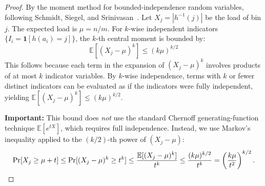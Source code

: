 \documentclass[11pt]{article}
\begin{document}
\begin{proof}
By the moment method for bounded-independence random variables,
following Schmidt, Siegel, and Srinivasan~\cite{schmidt1995chernoff}.
Let $X_j = |h^{-1}(j)|$ be the load of bin $j$.  The expected load is
$\mu = n/m$.  For $k$-wise independent indicators $\{I_i = \mathbf{1}[h(a_i) = j]\}$,
the $k$-th central moment is bounded by:
\[
  \mathbb{E}[(X_j - \mu)^k] \le (k\mu)^{k/2}
\]
This follows because each term in the expansion of $(X_j - \mu)^k$
involves products of at most $k$ indicator variables.  By $k$-wise
independence, terms with $k$ or fewer distinct indicators can be
evaluated as if the indicators were fully independent, yielding
$\mathbb{E}[(X_j - \mu)^k] \le (k\mu)^{k/2}$.

\textbf{Important:} This bound does \emph{not} use the standard Chernoff
generating-function technique $\mathbb{E}[e^{tX}]$, which requires full
independence.  Instead, we use Markov's inequality applied to
the $(k/2)$-th power of $(X_j - \mu)$:
\[
  \Pr[X_j \ge \mu + t] \le \Pr[(X_j - \mu)^{k} \ge t^{k}]
  \le \frac{\mathbb{E}[(X_j - \mu)^{k}]}{t^{k}}
  \le \frac{(k\mu)^{k/2}}{t^{k}}
  = \left(\frac{k\mu}{t^2}\right)^{k/2}. \qedhere
\]
\end{proof}
\end{document}
